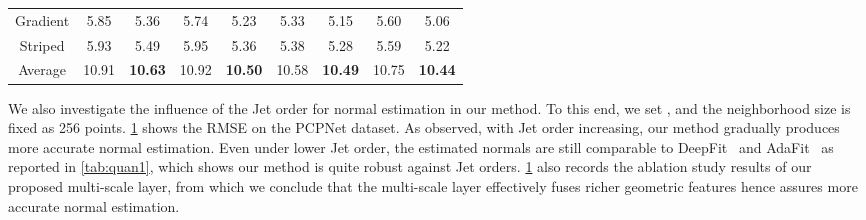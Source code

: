 \documentclass[runningheads]{llncs}
\begin{document}
\begin{table}[t]
\begin{center}
{\begin{tabular}{@{}ccccccccc@{}}
Gradient & 5.85                    & 5.36                    & 5.74                    & 5.23                    & 5.33                    & 5.15                    & 5.60                    & 5.06                    \\
Striped    & 5.93                    & 5.49                    & 5.95                    & 5.36                    & 5.38                    & 5.28                    & 5.59                    & 5.22                    \\
Average                   & 10.91                   & \textbf{10.63}                   & 10.92                   & \textbf{10.50}                   & 10.58                   & \textbf{10.49}                   & 10.75                   &\textbf{ 10.44}                   \\ \bottomrule
\end{tabular}}
\label{tab:njet}
\end{center}
\end{table}
 We also investigate the influence of the Jet order for normal estimation in our method. To this end, we set , and the neighborhood size is fixed as 256 points. \cref{tab:njet} shows the RMSE on the PCPNet dataset. As observed, with Jet order increasing, our method gradually produces more accurate normal estimation. Even under lower Jet order, the estimated normals are still comparable to DeepFit~\cite{ben2020deepfit} and AdaFit~\cite{zhu2021adafit} as reported in \cref{tab:quan1}, which shows our method is quite robust against Jet orders. \cref{tab:njet} also records the ablation study results of our proposed multi-scale layer, from which we conclude that the multi-scale layer effectively fuses richer geometric features hence assures more accurate normal estimation.
\end{document}
